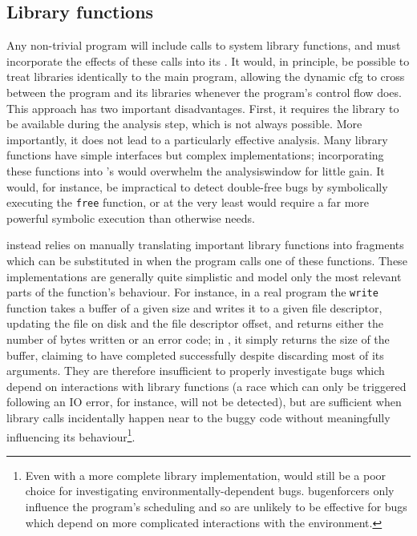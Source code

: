 \subsection{Library functions}
\label{sect:derive:library_functions}

Any non-trivial program will include calls to system library
functions, and {\technique} must incorporate the effects of these
calls into its {\StateMachines}.  It would, in principle, be possible
to treat libraries identically to the main program, allowing the
\gls{dynamic cfg} to cross between the program and its libraries
whenever the program's control flow does.  This approach has two
important disadvantages.  First, it requires the library to be
available during the analysis step, which is not always possible.
More importantly, it does not lead to a particularly effective
analysis.  Many library functions have simple interfaces but complex
implementations; incorporating these functions into {\technique}'s
{\StateMachines} would overwhelm the \gls{analysiswindow} for little
gain.  It would, for instance, be impractical to detect double-free
bugs by symbolically executing the \texttt{free} function, or at the
very least would require a far more powerful symbolic execution than
{\technique} otherwise needs.

{\Technique} instead relies on manually translating important library
functions into {\StateMachine} fragments which can be substituted in
when the program calls one of these functions.  These implementations
are generally quite simplistic and model only the most relevant parts
of the function's behaviour.  For instance, in a real program the
\texttt{write} function takes a buffer of a given size and writes it
to a given file descriptor, updating the file on disk and the file
descriptor offset, and returns either the number of bytes written or
an error code; in {\atechnique} {\StateMachine}, it simply returns the
size of the buffer, claiming to have completed successfully despite
discarding most of its arguments.  They are therefore insufficient to
properly investigate bugs which depend on interactions with library
functions (a race which can only be triggered following an IO error,
for instance, will not be detected), but are sufficient when library
calls incidentally happen near to the buggy code without meaningfully
influencing its behaviour\footnote{Even with a more complete
  {\StateMachine} library implementation, {\technique} would still be
  a poor choice for investigating environmentally-dependent bugs.
  \protect\Glspl{bugenforcer} only influence the program's scheduling
  and so are unlikely to be effective for bugs which depend on more
  complicated interactions with the environment.}\!\!\!.

